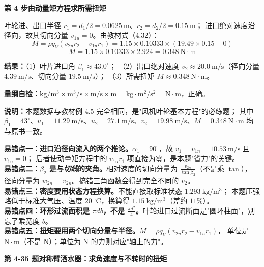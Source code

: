 \begin{jie}
\textbf{第 4 步\quad 由动量矩方程求所需扭矩}

叶轮进、出口半径 $r_1=d_1/2=0.0625\ \mathrm{m}$、$r_2=d_2/2=0.15\ \mathrm{m}$；
进口绝对速度沿径向，故其切向分量 $v_{1u}=0$。由教材式（4.32）：
\[ M=\rho q_V\left(v_{2u}r_2-v_{1u}r_1\right)
   =1.15\times0.10333\times\left(19.49\times0.15-0\right) \]
\[ M=1.15\times0.10333\times2.924=0.348\ \mathrm{N\cdot m} \]

\textbf{结果：}（1）叶片进口角 $\beta_1\approx43.0^\circ$；
（2）出口绝对速度 $v_2\approx20.0\ \mathrm{m/s}$（径向分量 $4.39\ \mathrm{m/s}$、切向分量 $19.5\ \mathrm{m/s}$）；
（3）所需扭矩 $M\approx0.348\ \mathrm{N\cdot m}$。

\textbf{量纲自检：}$\mathrm{kg/m^3\times m^3/s\times m/s\times m}=\mathrm{kg\cdot m^2/s^2}=\mathrm{N\cdot m}$，正确。

\textbf{说明：}本题数据与教材例 4.5 完全相同，是"风机叶轮基本方程"的必练题；
其中 $\beta_1=43^\circ$、$u_1=11.29\ \mathrm{m/s}$、$u_2=27.1\ \mathrm{m/s}$、$v_2=19.98\ \mathrm{m/s}$、$M=0.348\ \mathrm{N\cdot m}$
均与原书一致。
\end{jie}

\begin{yicuo}
\textbf{易错点一：进口沿径向流入的两个推论。}$\alpha_1=90^\circ$，故 $v_1=v_{1n}=10.53\ \mathrm{m/s}$ 且 $v_{1u}=0$；
后者使动量矩方程中的 $v_{1u}r_1$ 项直接为零，是本题"省力"的关键。\\
\textbf{易错点二：$\beta_2$ 是与\emph{切线}的夹角。}相对速度的切向分量为 $\frac{v_{2n}}{\tan\beta_2}$（不是乘 $\tan$），
径向分量为 $w_{2n}=v_{2n}$。搞错三角函数会得到完全不同的 $v_2$。\\
\textbf{易错点三：密度要用状态方程换算。}不能直接取标准状态 $1.293\ \mathrm{kg/m^3}$；
本题压强略低于标准大气压、温度 $20\ \mathrm{^\circ C}$，换算得 $1.15\ \mathrm{kg/m^3}$（差约 $11\%$）。\\
\textbf{易错点四：环形过流面积是 $\pi db$，不是 $\frac{\pi d^2}{4}$。}叶轮进口过流断面是"圆环柱面"，别忘了乘宽度 $b$。\\
\textbf{易错点五：扭矩要用两个切向分量与半径。}$M=\rho q_V(v_{2u}r_2-v_{1u}r_1)$，
单位是 $\mathrm{N\cdot m}$（不是 $\mathrm{N}$）；单位为 $\mathrm{N}$ 的力则对应"轴上的力"。
\end{yicuo}

\noindent\textbf{第 4-35 题\quad 对称臂洒水器：求角速度与不转时的扭矩}


